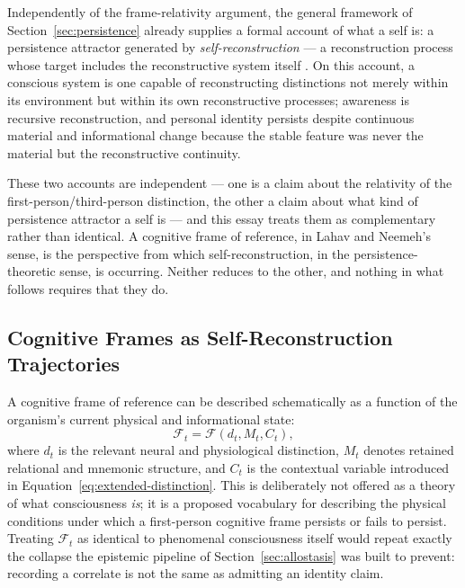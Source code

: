 \documentclass[12pt]{article}
\begin{document}
Independently of the frame-relativity argument, the general framework of Section~\ref{sec:persistence} already supplies a formal account of what a self is: a persistence attractor generated by \emph{self-reconstruction} --- a reconstruction process whose target includes the reconstructive system itself \cite{flyxion2026persistence}. On this account, a conscious system is one capable of reconstructing distinctions not merely within its environment but within its own reconstructive processes; awareness is recursive reconstruction, and personal identity persists despite continuous material and informational change because the stable feature was never the material but the reconstructive continuity.

These two accounts are independent --- one is a claim about the relativity of the first-person/third-person distinction, the other a claim about what kind of persistence attractor a self is --- and this essay treats them as complementary rather than identical. A cognitive frame of reference, in Lahav and Neemeh's sense, is the perspective from which self-reconstruction, in the persistence-theoretic sense, is occurring. Neither reduces to the other, and nothing in what follows requires that they do.

\subsection{Cognitive Frames as Self-Reconstruction Trajectories}

A cognitive frame of reference can be described schematically as a function of the organism's current physical and informational state:
\begin{equation}
\mathcal{F}_t = \mathcal{F}(d_t, M_t, C_t),
\label{eq:cognitive-frame}
\end{equation}
where $d_t$ is the relevant neural and physiological distinction, $M_t$ denotes retained relational and mnemonic structure, and $C_t$ is the contextual variable introduced in Equation~\eqref{eq:extended-distinction}. This is deliberately not offered as a theory of what consciousness \emph{is}; it is a proposed vocabulary for describing the physical conditions under which a first-person cognitive frame persists or fails to persist. Treating $\mathcal{F}_t$ as identical to phenomenal consciousness itself would repeat exactly the collapse the epistemic pipeline of Section~\ref{sec:allostasis} was built to prevent: recording a correlate is not the same as admitting an identity claim.
\end{document}
